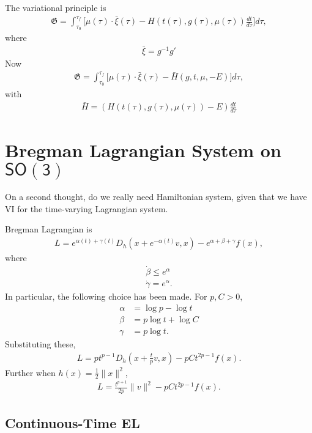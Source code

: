 \documentclass[letterpaper, 10pt, conference]{ieeeconf}
\newcommand{\SO}{\ensuremath{\mathsf{SO(3)}}}
\begin{document}
The variational principle is
\begin{align*}
    \mathfrak{G} = \int_{\tau_0}^{\tau_f}  \big[ \mu(\tau) \cdot \bar\xi(\tau) - H(t(\tau), g(\tau), \mu(\tau)) \frac{dt}{d\tau}\big]  d\tau,
\end{align*}
where
\begin{align*}
    \bar \xi = g^{-1} g'
\end{align*}
Now
\begin{align*}
    \mathfrak{G} = \int_{\tau_0}^{\tau_f}  \big[ \mu(\tau) \cdot \bar\xi(\tau) - \bar H( g,t,\mu,-E) \big]  d\tau,
\end{align*}
with
\begin{align*}
    \bar H = (H(t(\tau), g(\tau), \mu(\tau))- E) \frac{dt}{d\tau}
\end{align*}

\section{Bregman Lagrangian System on $\SO$}

On a second thought, do we really need Hamiltonian system, given that we have VI for the time-varying Lagrangian system. 

Bregman Lagrangian is
\begin{align*}
    L = e^{\alpha(t)+\gamma(t)} D_h(x+ e^{-\alpha(t)} v, x) - e^{\alpha+\beta+\gamma} f(x),
\end{align*}
where 
\begin{align*}
    \dot\beta \leq e^\alpha\\
    \dot \gamma = e^\alpha.
\end{align*}
In particular, the following choice has been made. 
For $p,C>0$,
\begin{align*}
    \alpha & = \log p - \log t\\
    \beta & = p\log t + \log C\\
    \gamma & = p \log t.
\end{align*}
Substituting these,
\begin{align*}
    L = p t^{p-1} D_h(x+ \frac{t}{p} v, x) - p C t^{2p-1} f(x).
\end{align*}
Further when $h(x)=\frac{1}{2}\|x\|^2$, 
\begin{align*}
    L = \frac{t^{p+1}}{2p} \| v\|^2 - p C t^{2p-1} f(x).
\end{align*}


\subsection{Continuous-Time EL}
\end{document}
